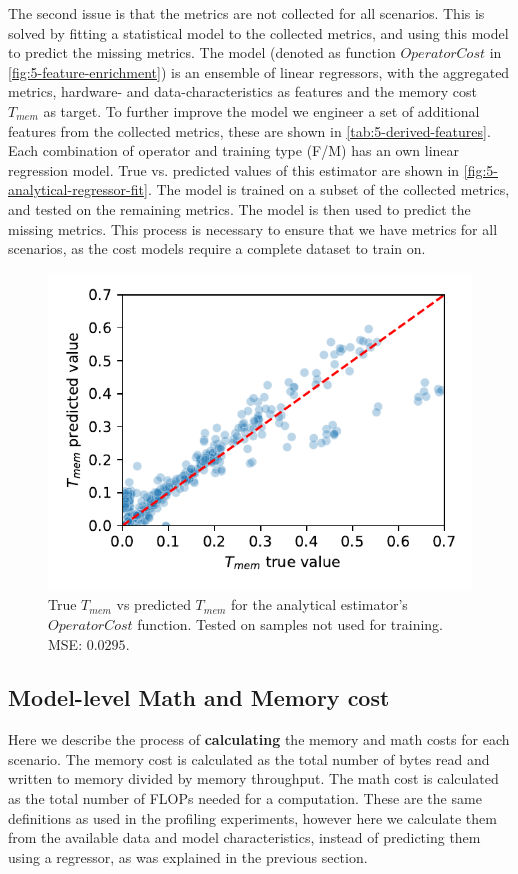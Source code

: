 The second issue is that the metrics are not collected for all scenarios. This is solved by fitting a statistical model to the collected metrics, and using this model to predict the missing metrics. The model (denoted as function $OperatorCost$ in \autoref{fig:5-feature-enrichment}) is an ensemble of linear regressors, with the aggregated metrics, hardware- and data-characteristics as features and the memory cost $T_{mem}$ as target. To further improve the model we engineer a set of additional features from the collected metrics, these are shown in \autoref{tab:5-derived-features}. Each combination of operator and training type (F/M) has an own linear regression model. True vs. predicted values of this estimator are shown in \autoref{fig:5-analytical-regressor-fit}. The model is trained on a subset of the collected metrics, and tested on the remaining metrics. The model is then used to predict the missing metrics. This process is necessary to ensure that we have metrics for all scenarios, as the cost models require a complete dataset to train on.

\begin{figure}[ht]
    \centering
    \includegraphics[width=0.5\linewidth]{chapters/05_cost_estimation/figures/analytical-regressor-fit.pdf}
    \caption{True $T_{mem}$ vs predicted $T_{mem}$ for the analytical estimator's $OperatorCost$ function. Tested on samples not used for training. MSE: $0.0295$.}
    \label{fig:5-analytical-regressor-fit}
\end{figure}

\subsection{Model-level Math and Memory cost}
Here we describe the process of \textbf{calculating} the memory and math costs for each scenario. The memory cost is calculated as the total number of bytes read and written to memory divided by memory throughput. The math cost is calculated as the total number of FLOPs needed for a computation. These are the same definitions as used in the profiling experiments, however here we calculate them from the available data and model characteristics, instead of predicting them using a regressor, as was explained in the previous section.

